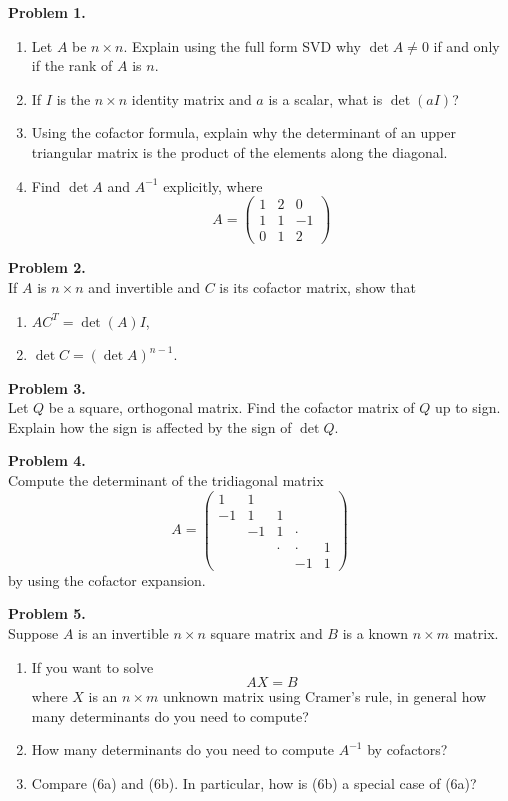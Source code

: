 \documentclass[11pt]{article}
\begin{document}
\noindent \textbf{Problem 1.}\\
\begin{enumerate}
\item Let $A$ be $n\times n$. Explain using the full form SVD why $\det A\neq 0$ if and only if the rank of $A$ is $n$.
\item If $I$ is the $n \times n$ identity matrix  and $a$ is a scalar, what is $\det(aI)$?
\item Using the cofactor formula, explain why the determinant of an upper triangular matrix is the product of the elements along the diagonal.
\item Find $\det A$ and $A^{-1}$ explicitly, where
$$A = \begin{pmatrix} 1 & 2 & 0 \\ 1 & 1 & -1 \\ 0 & 1 & 2 \end{pmatrix}$$
\end{enumerate}

\vskip 250pt

\noindent \textbf{Problem 2.}\\
If $A$ is $n \times n$ and invertible and $C$ is its cofactor matrix, show that
\begin{enumerate}
\item $AC^T = \det(A)I$,
\item $\det C = (\det A)^{n-1}$.
\end{enumerate}

\newpage

\noindent \textbf{Problem 3.}\\
Let $Q$ be a square, orthogonal matrix. Find the cofactor matrix of $Q$ up to sign. Explain how the sign is affected by the sign of $\det Q$.

\vskip 250pt

\noindent \textbf{Problem 4.}\\
Compute the determinant of the tridiagonal matrix
$$A = \begin{pmatrix} 1 & 1 & & & \\ -1 & 1 & 1 & & \\ & -1 & 1 & \cdot & \\ & & \cdot & \cdot & 1 \\ & & & -1 & 1 \end{pmatrix} $$
by using the cofactor expansion. 

\newpage

\noindent \textbf{Problem 5.}\\
Suppose $A$ is an invertible $n \times n$ square matrix and $B$ is a known $n \times m$ matrix.
\begin{enumerate}
\item If you want to solve
$$AX = B$$
where $X$ is an $n \times m$ unknown matrix using Cramer's rule, in general how many determinants do you need to compute?
\item How many determinants do you need to compute $A^{-1}$ by cofactors?
\item Compare (6a) and (6b). In particular, how is (6b) a special case of (6a)?
\end{enumerate}
\end{document}
